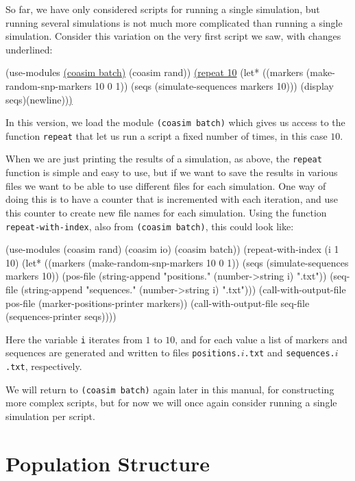 \documentclass{manual}
\begin{document}
\begin{empfile}
So far, we have only considered scripts for running a single
simulation, but running several simulations is not much more
complicated than running a single simulation.  Consider this variation
on the very first script we saw, with changes underlined:
\begin{code}
(use-modules \underline{(coasim batch)} (coasim rand))
\underline{(repeat 10}
   (let* ((markers (make-random-snp-markers 10 0 1))
          (seqs (simulate-sequences markers 10)))
     (display seqs)(newline))\underline{)}
\end{code}

In this version, we load the module \texttt{(coasim batch)} which
gives us access to the function \texttt{repeat} that let us run a
script a fixed number of times, in this case $10$.

When we are just printing the results of a simulation, as above, the
\texttt{repeat} function is simple and easy to use, but if we want to
save the results in various files we want to be able to use different
files for each simulation.  One way of doing this is to have a counter
that is incremented with each iteration, and use this counter to
create new file names for each simulation.  Using the function
\texttt{repeat-with-index}, also from \texttt{(coasim batch)}, this
could look like:
\begin{code}
(use-modules (coasim rand) (coasim io) (coasim batch))
(repeat-with-index (i 1 10)
   (let* ((markers (make-random-snp-markers 10 0 1))
          (seqs (simulate-sequences markers 10))
          (pos-file (string-append "positions." (number->string i) ".txt"))
          (seq-file (string-append "sequences." (number->string i) ".txt")))
     (call-with-output-file pos-file (marker-positions-printer markers))
     (call-with-output-file seq-file (sequences-printer seqs))))
\end{code}
Here the variable \texttt{i} iterates from $1$ to $10$, and for each
value a list of markers and sequences are generated and written to
files \texttt{positions.}$i$\texttt{.txt} and
\texttt{sequences.}$i$\texttt{.txt}, respectively.

We will return to \texttt{(coasim batch)} again later in this manual,
for constructing more complex scripts, but for now we will once again
consider running a single simulation per script.



\section{Population Structure}
\label{sec:pop-structure}


\end{empfile}
\end{document}
